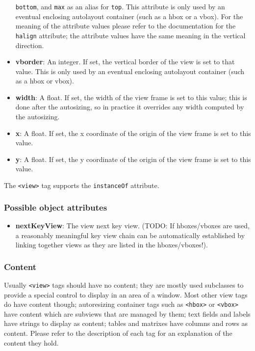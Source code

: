 \begin{itemize}
  \texttt{bottom}, and \texttt{max} as an alias for \texttt{top}.
  This attribute is only used by an eventual enclosing autolayout
  container (such as a hbox or a vbox).  For the meaning of the
  attribute values please refer to the documentation for the
  \texttt{halign} attribute; the attribute values have the same
  meaning in the vertical direction.
\item {\bf vborder}: An integer.  If set, the vertical border of the
  view is set to that value.  This is only used by an eventual
  enclosing autolayout container (such as a hbox or vbox).
\item {\bf width}: A float.  If set, the width of the view frame is
  set to this value; this is done after the autosizing, so in practice
  it overrides any width computed by the autosizing.
\item {\bf x}: A float.  If set, the x coordinate of the origin of the
  view frame is set to this value.
\item {\bf y}: A float.  If set, the y coordinate of the origin of the
  view frame is set to this value.
\end{itemize}

The \texttt{<view>} tag supports the \texttt{instanceOf} attribute.

\subsubsection{Possible object attributes}
\begin{itemize}
\item {\bf nextKeyView}: The view next key view.  (TODO: If
  hboxes/vboxes are used, a reasonably meaningful key view chain can
  be automatically established by linking together views as they are
  listed in the hboxes/vboxes!).
\end{itemize}

\subsubsection{Content}
Usually \texttt{<view>} tags should have no content; they are mostly
used subclasses to provide a special control to display in an area of
a window.  Most other view tags do have content though; autoresizing
container tags such as \texttt{<hbox>} or \texttt{<vbox>} have content
which are subviews that are managed by them; text fields and labels
have strings to display as content; tables and matrixes have columns
and rows as content.  Please refer to the description of each tag for
an explanation of the content they hold.

